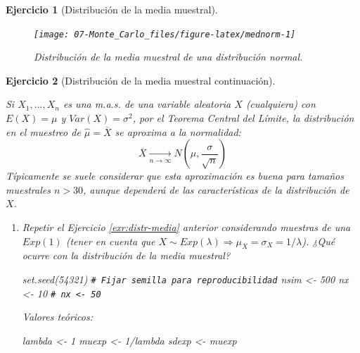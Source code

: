 \documentclass[
  10pt,
]{book}
\newenvironment{Shaded}{\begin{snugshade}}{\end{snugshade}}
\newcommand{\CommentTok}[1]{\textcolor[rgb]{0.56,0.35,0.01}{\textit{#1}}}
\newcommand{\DecValTok}[1]{\textcolor[rgb]{0.00,0.00,0.81}{#1}}
\newcommand{\FunctionTok}[1]{\textcolor[rgb]{0.00,0.00,0.00}{#1}}
\newcommand{\NormalTok}[1]{#1}
\newcommand{\OtherTok}[1]{\textcolor[rgb]{0.56,0.35,0.01}{#1}}
\newcommand{\SpecialCharTok}[1]{\textcolor[rgb]{0.00,0.00,0.00}{#1}}
\theoremstyle{break}
\newtheorem{exercise}{Ejercicio}[chapter]
\theoremstyle{nonumberplain}
\renewcommand{\CommentTok}[1]{\textcolor[rgb]{0.41,0.41,0.41}{\texttt{#1}}}
\begin{document}
\begin{exercise}[Distribución de la media muestral]
\begin{enumerate}
  \begin{figure}[!htbp]

  {\centering \texttt{[image: 07-Monte\_Carlo\_files/figure-latex/mednorm-1]} 

  }

  \caption{Distribución de la media muestral de una distribución normal.}\label{fig:mednorm}
  \end{figure}
\end{enumerate}

\end{exercise}

\vspace{0.5cm}

\begin{exercise}[Distribución de la media muestral continuación]
\protect\hypertarget{exr:distr-mediab}{}\label{exr:distr-mediab}

Si \(X_{1},\ldots,X_{n}\) es una m.a.s. de una variable aleatoria
\(X\) (cualquiera) con \(E\left( X \right) = \mu\) y
\(Var\left( X \right) = \sigma^{2}\), por el Teorema Central del Límite,
la distribución en el muestreo de \(\hat{\mu}=\overline{X}\) se aproxima a la
normalidad:
\[\overline{X}\underset{n\rightarrow\infty}{\longrightarrow}
N\left( \mu, \dfrac{\sigma}{\sqrt{n}}\right)\]
Típicamente se suele considerar que esta aproximación es buena
para tamaños muestrales \(n>30\),
aunque dependerá de las características de la distribución de \(X\).

\begin{enumerate}
\def\labelenumi{\alph{enumi})}
\item
  Repetir el Ejercicio \ref{exr:distr-media} anterior considerando muestras de una \(Exp(1)\) (tener en cuenta que \(X\sim Exp(\lambda)\Rightarrow\mu_{X}=\sigma_{X}=1/\lambda\)).
  ¿Qué ocurre con la distribución de la media muestral?

\begin{Shaded}
\begin{Highlighting}[]
\FunctionTok{set.seed}\NormalTok{(}\DecValTok{54321}\NormalTok{) }\CommentTok{\# Fijar semilla para reproducibilidad}
\NormalTok{nsim }\OtherTok{\textless{}{-}} \DecValTok{500}
\NormalTok{nx }\OtherTok{\textless{}{-}} \DecValTok{10}    
\CommentTok{\# nx \textless{}{-} 50}
\end{Highlighting}
\end{Shaded}

  Valores teóricos:

\begin{Shaded}
\begin{Highlighting}[]
\NormalTok{lambda }\OtherTok{\textless{}{-}} \DecValTok{1}
\NormalTok{muexp }\OtherTok{\textless{}{-}} \DecValTok{1}\SpecialCharTok{/}\NormalTok{lambda}
\NormalTok{sdexp }\OtherTok{\textless{}{-}}\NormalTok{ muexp}
\end{Highlighting}
\end{Shaded}


\end{enumerate}
\end{exercise}
\end{document}
